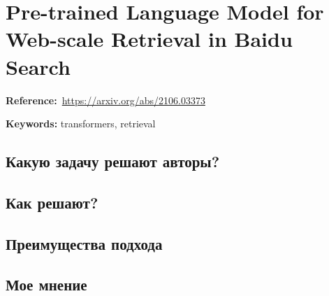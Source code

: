 \chapter{Pre-trained Language Model for Web-scale Retrieval in Baidu Search}

\textbf{Reference:}~\url{https://arxiv.org/abs/2106.03373}

\textbf{Keywords:} transformers, retrieval

\section*{Какую задачу решают авторы?}


\section*{Как решают?}


\section*{Преимущества подхода}


\section*{Мое мнение}
